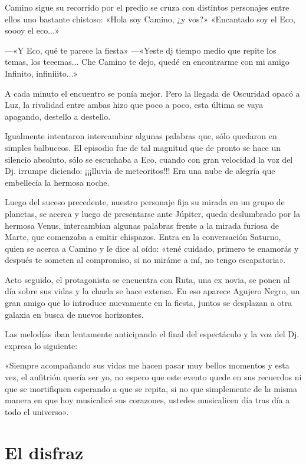 \documentclass[11pt,twoside,openright,a5paper]{book}
\begin{document}
Camino sigue su recorrido por el predio se cruza con distintos personajes entre ellos uno bastante chistoso: «Hola soy Camino, ¿y vos?»  «Encantado soy el Eco, soooy el eco...»

---«Y Eco, qué te parece la fiesta» 
---«Yeste dj tiempo medio que repite los temas, los teeemas... Che Camino te dejo, quedé en encontrarme con mi amigo Infinito, infiniiito...»

A cada minuto el encuentro se ponía mejor. Pero la llegada de Oscuridad opacó a Luz, la rivalidad entre ambas hizo que poco a poco, esta última se vaya apagando, destello a destello. 

Igualmente intentaron intercambiar algunas palabras que, sólo quedaron en simples balbuceos. El episodio fue de tal magnitud que de pronto se hace un silencio absoluto, sólo se escuchaba a Eco, cuando con gran velocidad la voz del Dj. irrumpe diciendo: ¡¡¡lluvia de meteoritos!!! Era una nube de alegría que embellecía la hermosa noche.

Luego del suceso precedente, nuestro personaje fija su mirada en un grupo de planetas, se acerca y luego de presentarse ante Júpiter, queda deslumbrado por la hermosa Venus, intercambian algunas palabras frente a la mirada furiosa de Marte, que comenzaba a emitir chispazos. Entra en la conversación Saturno, quien se acerca a Camino y le dice al oído: «tené cuidado, primero te enamorás y después te someten al compromiso, si no miráme a mí, no tengo escapatoria».

Acto seguido, el protagonista se encuentra con Ruta, una ex novia, se ponen al día sobre sus vidas y la charla se hace extensa. En eso aparece Agujero Negro, un gran amigo que lo introduce nuevamente en la fiesta, juntos se desplazan a otra galaxia en busca de nuevos horizontes.

Las melodías iban lentamente anticipando el final del espectáculo y la voz del Dj. expresa lo siguiente:

«Siempre acompañando sus vidas me hacen pasar muy bellos momentos y esta vez, el anfitrión quería ser yo, no espero que este evento quede en sus recuerdos ni que se mortifiquen esperando a que se repita, si no que simplemente de la misma manera en que hoy musicalicé sus corazones, ustedes musicalicen día tras día a todo el universo».
\clearpage
\section*{El disfraz}
\end{document}
